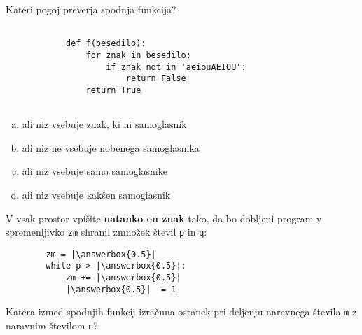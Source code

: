 \documentclass[arhiv, 10pt]{../izpit}
\newcommand{\inlinepy}[1]{\texttt{#1}}
\newcommand{\answerbox}[1]{\framebox{\vphantom{\large M}\hspace{#1cm}}}
\begin{document}
        \naloga*

        \begin{multicols}{2}
        \noindent
        Kateri pogoj preverja spodnja funkcija?
        \begin{verbatim}
        
            def f(besedilo):
                for znak in besedilo:
                    if znak not in 'aeiouAEIOU':
                        return False
                return True
            
        \end{verbatim}

        \begin{enumerate}[(a)]
\item ali niz vsebuje znak, ki ni samoglasnik
\item ali niz ne vsebuje nobenega samoglasnika
\item ali niz vsebuje samo samoglasnike
\item ali niz vsebuje kakšen samoglasnik
\end{enumerate}

        \end{multicols}
    
        \naloga*
        \begin{multicols}{2}
        \noindent
        V vsak prostor vpišite \textbf{natanko en znak} tako, da bo dobljeni program v spremenljivko \inlinepy{zm} shranil zmnožek števil \inlinepy{p} in \inlinepy{q}:
        
        \columnbreak
        \begin{verbatim}
        zm = |\answerbox{0.5}|
        while p > |\answerbox{0.5}|:
            zm += |\answerbox{0.5}|
            |\answerbox{0.5}| -= 1
        \end{verbatim}
        \end{multicols}
    
        \clearpage
        \naloga
        
        Katera izmed spodnjih funkcij izračuna ostanek pri deljenju naravnega števila \inlinepy{m} z naravnim številom \inlinepy{n}?
    
\end{document}
